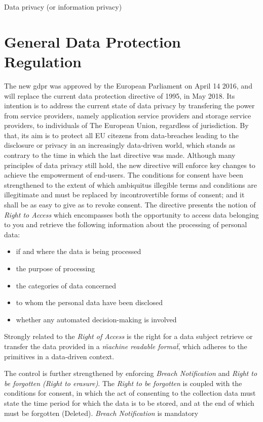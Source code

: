 \documentclass[USenglish]{uit-thesis}
\begin{document}
Data privacy (or information privacy) 
\section{General Data Protection Regulation}
The new \gls{gdpr} was approved by the European Parliament on April 14 2016, and will replace the current
data protection directive of 1995, in May 2018.
Its intention is to address the current state of data privacy by transfering the power from
service providers, namely application service providers and storage service providers,
to individuals of The European Union, regardless of jurisdiction.
By that, its aim is to protect all EU citezens from data-breaches leading to
the disclosure or privacy in an increasingly data-driven world, which stands as
contrary to the time in which the last directive was made.
Although many principles of data privacy still hold,
the new directive will enforce key changes to achieve the empowerment of end-users.
The conditions for consent have been strengthened to the extent of which
ambiquitus illegible terms and conditions are illegitimate and must be replaced
by incontrovertible forms of consent; and it shall be as easy to give as to
revoke consent.
The directive presents the notion of \textit{Right to Access} which encompasses
both the opportunity to access data belonging to you and retrieve the following information about
the processing of personal data:
\begin{itemize}
    \item if and where the data is being processed
    \item the purpose of processing
    \item the categories of data concerned
    \item to whom the personal data have been disclosed
    \item whether any automated decision-making is involved
\end{itemize}
Strongly related to the \textit{Right of Access} is the right for a data subject
retrieve or transfer the data provided in a \textit{\"machine readable format\"},
which adheres to the primitives in a data-driven context.

The control is further strengthened by enforcing \textit{Breach Notification} and
\textit{Right to be forgotten (Right to erasure)}.
The \textit{Right to be forgotten} is coupled with the conditions for consent,
in which the act of consenting to the collection data must state the time period
for which the data is to be stored, and at the end of which must be forgotten (Deleted).
\textit{Breach Notification} is mandatory
\end{document}
